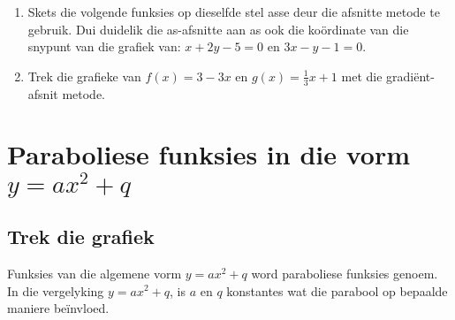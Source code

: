 \begin{exercises}{}
{\begin{enumerate}[noitemsep, label=\textbf{\arabic*}. ]
\begin{figure}[H]
\end{figure}   
\item Skets die volgende funksies op dieselfde stel asse deur die afsnitte metode te gebruik. Dui duidelik die as-afsnitte aan as ook die ko\"ordinate van die snypunt van die grafiek van: $x+2y-5=0$ en $3x-y-1=0$.
\item Trek die grafieke van $f(x)=3-3x$ en $g(x)=\frac{1}{3}x+1$ met die gradi\"ent-afsnit metode.
\end{enumerate}

}
\end{exercises}
   

\section{Paraboliese funksies in die vorm $y=a{x}^{2}+q$}
\subsection*{Trek die grafiek}         
Funksies van die algemene vorm  $y=a{x}^{2}+q$  word paraboliese funksies genoem. In die vergelyking $y=a{x}^{2}+q$, is $a$ en $q$ konstantes wat die parabool op bepaalde maniere be\"invloed. 
\par
{}

